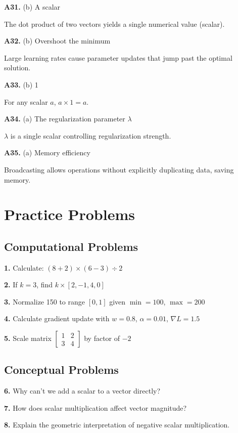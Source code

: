 \documentclass[11pt,a4paper]{article}
\begin{document}
\textbf{A31.} (b) A scalar

The dot product of two vectors yields a single numerical value (scalar).

\textbf{A32.} (b) Overshoot the minimum

Large learning rates cause parameter updates that jump past the optimal solution.

\textbf{A33.} (b) 1

For any scalar $a$, $a \times 1 = a$.

\textbf{A34.} (a) The regularization parameter $\lambda$

$\lambda$ is a single scalar controlling regularization strength.

\textbf{A35.} (a) Memory efficiency

Broadcasting allows operations without explicitly duplicating data, saving memory.

\section{Practice Problems}

\subsection{Computational Problems}

\textbf{1.} Calculate: $(8 + 2) \times (6 - 3) \div 2$

\textbf{2.} If $k = 3$, find $k \times [2, -1, 4, 0]$

\textbf{3.} Normalize 150 to range $[0, 1]$ given $\min=100$, $\max=200$

\textbf{4.} Calculate gradient update with $w=0.8$, $\alpha=0.01$, $\nabla L=1.5$

\textbf{5.} Scale matrix $\begin{bmatrix} 1 & 2 \\ 3 & 4 \end{bmatrix}$ by factor of $-2$

\subsection{Conceptual Problems}

\textbf{6.} Why can't we add a scalar to a vector directly?

\textbf{7.} How does scalar multiplication affect vector magnitude?

\textbf{8.} Explain the geometric interpretation of negative scalar multiplication.
\end{document}
